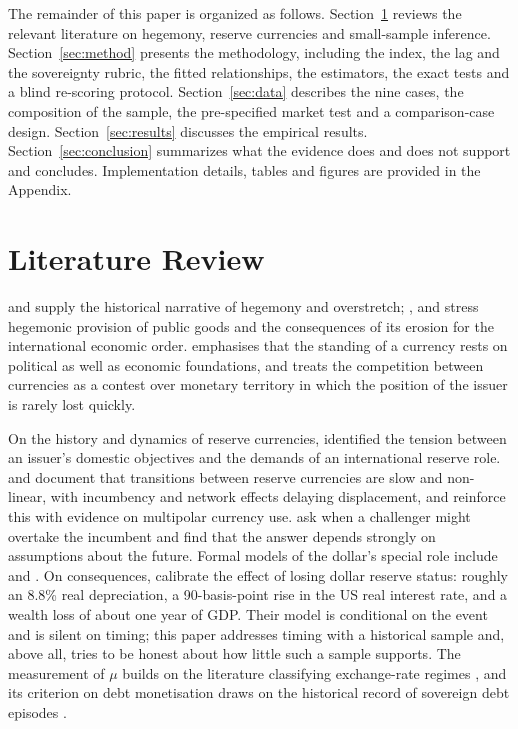 \documentclass[11pt,letterpaper]{article}
\theoremstyle{definition}
\theoremstyle{plain}
\begin{document}
The remainder of this paper is organized as follows. Section~\ref{sec:lit} reviews the relevant literature on hegemony, reserve currencies and small-sample inference. Section~\ref{sec:method} presents the methodology, including the index, the lag and the sovereignty rubric, the fitted relationships, the estimators, the exact tests and a blind re-scoring protocol. Section~\ref{sec:data} describes the nine cases, the composition of the sample, the pre-specified market test and a comparison-case design. Section~\ref{sec:results} discusses the empirical results. Section~\ref{sec:conclusion} summarizes what the evidence does and does not support and concludes. Implementation details, tables and figures are provided in the Appendix.

\section{Literature Review}\label{sec:lit}
\citet{kennedy1987} and \citet{arrighi1994} supply the historical narrative of hegemony and overstretch; \citet{gilpin1981}, \citet{kindleberger1973} and \citet{keohane1984} stress hegemonic provision of public goods and the consequences of its erosion for the international economic order. \citet{strange1971} emphasises that the standing of a currency rests on political as well as economic foundations, and \citet{cohen1998} treats the competition between currencies as a contest over monetary territory in which the position of the issuer is rarely lost quickly.

On the history and dynamics of reserve currencies, \citet{triffin1960} identified the tension between an issuer's domestic objectives and the demands of an international reserve role. \citet{eichengreen2011} and \citet{eichengreen2009} document that transitions between reserve currencies are slow and non-linear, with incumbency and network effects delaying displacement, and \citet{eichengreen2017} reinforce this with evidence on multipolar currency use. \citet{chinn2007} ask when a challenger might overtake the incumbent and find that the answer depends strongly on assumptions about the future. Formal models of the dollar's special role include \citet{gourinchas2007} and \citet{farhi2018}. On consequences, \citet{jiang2026} calibrate the effect of losing dollar reserve status: roughly an 8.8\% real depreciation, a 90-basis-point rise in the US real interest rate, and a wealth loss of about one year of GDP. Their model is conditional on the event and is silent on timing; this paper addresses timing with a historical sample and, above all, tries to be honest about how little such a sample supports. The measurement of $\mu$ builds on the literature classifying exchange-rate regimes \citep{ilzetzki2019}, and its criterion on debt monetisation draws on the historical record of sovereign debt episodes \citep{reinhart2009}.
\end{document}
